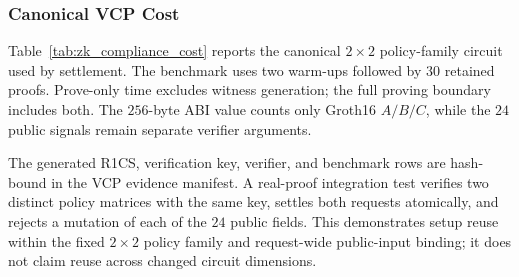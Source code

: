 \documentclass[10pt,journal,compsoc]{IEEEtran}
\begin{document}
\subsubsection{Canonical VCP Cost}

Table~\ref{tab:zk_compliance_cost} reports the canonical $2\times2$ policy-family circuit used by settlement. The benchmark uses two warm-ups followed by $30$ retained proofs. Prove-only time excludes witness generation; the full proving boundary includes both. The $256$-byte ABI value counts only Groth16 $A/B/C$, while the $24$ public signals remain separate verifier arguments.

\begin{table}[!t]
\centering
\caption{Canonical VCP proof costs. Gas denotes the isolated exported-verifier transaction and excludes lifecycle state transitions.}
\label{tab:zk_compliance_cost}
\scriptsize
{}
\end{table}

The generated R1CS, verification key, verifier, and benchmark rows are hash-bound in the VCP evidence manifest. A real-proof integration test verifies two distinct policy matrices with the same key, settles both requests atomically, and rejects a mutation of each of the $24$ public fields. This demonstrates setup reuse within the fixed $2\times2$ policy family and request-wide public-input binding; it does not claim reuse across changed circuit dimensions.
\end{document}
